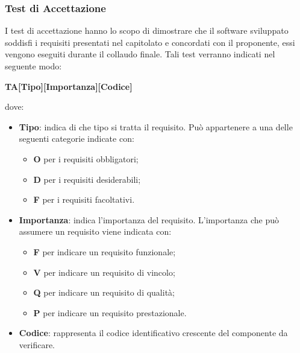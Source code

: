 \subsubsection{Test di Accettazione}
I test di accettazione hanno lo scopo di dimostrare che il software sviluppato 
soddisfi i requisiti presentati nel capitolato e concordati con il proponente, essi vengono eseguiti durante il
collaudo finale. Tali test verranno indicati nel seguente modo: \\
	\centerline{\textbf{TA[Tipo][Importanza][Codice]}}
dove:
\begin{itemize}
	\item \textbf{Tipo}: indica di che tipo si tratta il requisito. Può
		appartenere a una delle seguenti categorie indicate con:
		\begin{itemize}
			\item \textbf{O} per i requisiti obbligatori;
			\item \textbf{D} per i requisiti desiderabili;
			\item \textbf{F} per i requisiti facoltativi.			
		\end{itemize}
	\item \textbf{Importanza}: indica l'importanza del requisito. L'importanza
		che può assumere un requisito viene indicata con:
		\begin{itemize}
			\item \textbf{F} per indicare un requisito funzionale;
			\item \textbf{V} per indicare un requisito di vincolo;
			\item \textbf{Q} per indicare un requisito di qualità;
			\item \textbf{P} per indicare un requisito prestazionale. 
		\end{itemize}
	\item \textbf{Codice}: rappresenta il codice identificativo crescente
		del componente da verificare.
\end{itemize}


